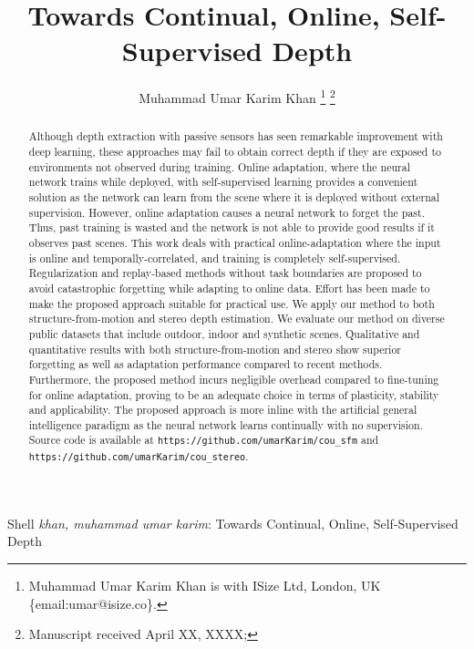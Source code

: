 \documentclass[lettersize,journal]{IEEEtran}
\begin{document}
\title{Towards Continual, Online, Self-Supervised Depth}

\author{Muhammad Umar Karim Khan
\thanks{Muhammad Umar Karim Khan is with ISize Ltd, London, UK \{email:umar@isize.co\}.}%
\thanks{Manuscript received April XX, XXXX;}}

%
{Shell \MakeLowercase{\textit{Khan, Muhammad Umar Karim}}: Towards Continual, Online, Self-Supervised Depth}


\maketitle


\begin{abstract}
Although depth extraction with passive sensors has seen remarkable improvement with deep learning, these approaches may fail to obtain correct depth if they are exposed to environments not observed during training. Online adaptation, where the neural network trains while deployed, with self-supervised learning provides a convenient solution as the network can learn from the scene where it is deployed without external supervision. However, online adaptation causes a neural network to forget the past. Thus, past training is wasted and the network is not able to provide good results if it observes past scenes. This work deals with practical online-adaptation where the input is online and temporally-correlated, and training is completely self-supervised. Regularization and replay-based methods without task boundaries are proposed to avoid catastrophic forgetting while adapting to online data. Effort has been made to make the proposed approach suitable for practical use. We apply our method to both structure-from-motion and stereo depth estimation. We evaluate our method on diverse public datasets that include outdoor, indoor and synthetic scenes. Qualitative and quantitative results with both structure-from-motion and stereo show superior forgetting as well as adaptation performance compared to recent methods. Furthermore, the proposed method incurs negligible overhead compared to fine-tuning for online adaptation, proving to be an adequate choice in terms of plasticity, stability and applicability. The proposed approach is more inline with the artificial general intelligence paradigm as the neural network learns continually with no supervision. Source code is available at \texttt{https://github.com/umarKarim/cou\_sfm} and \texttt{https://github.com/umarKarim/cou\_stereo}.
\end{abstract}
\end{document}

